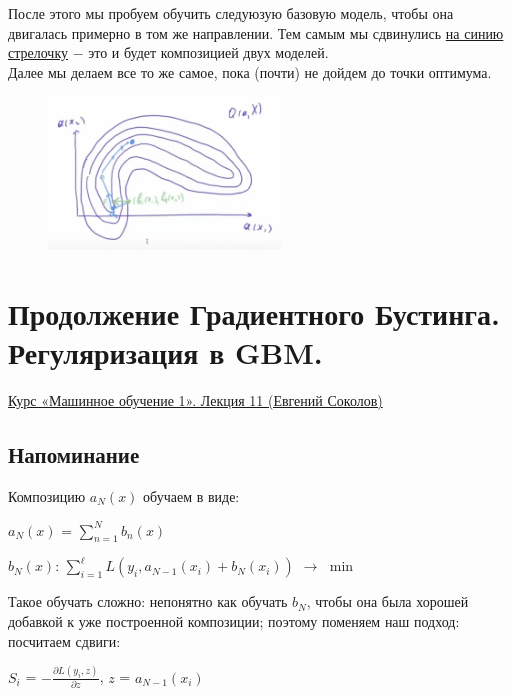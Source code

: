         После этого мы пробуем обучить следуюзую базовую модель, чтобы она двигалась примерно в том же направлении. Тем самым мы сдвинулись \underline{на синию стрелочку} $-$ это и будет композицией двух моделей.\\

        Далее мы делаем все то же самое, пока (почти) не дойдем до точки оптимума.

        \begin{figure}[H]
            \centering
            \includegraphics[width=0.55\textwidth]{images/10lecture/levelsGBM2.png}
        \end{figure}
     
        
        
        


\newpage
\section{Продолжение Градиентного Бустинга. Регуляризация в GBM. }
    \href{https://www.youtube.com/watch?v=C0gSbSjS1Xw&list=PLEqoHzpnmTfChItexxg2ZfxCsm-8QPsdS&index=13}{Курс «Машинное обучение 1». Лекция 11 (Евгений Соколов)}

    \subsection{Напоминание}

        Композицию $a_N(x)$ обучаем в виде:
        \begin{center}
            $a_N(x)$ = $\sum\limits_{n = 1}^{N}b_n(x)$
        \end{center}

        
        \begin{center}
            $b_N(x)$: \quad $\sum\limits_{i = 1}^{\ell}L(y_i, a_{N - 1}(x_i) + b_N(x_i))$ $\longrightarrow$ $\min$
        \end{center}

        Такое обучать сложно: непонятно как обучать $b_N$, чтобы она была хорошей добавкой к уже построенной композиции; поэтому поменяем наш подход: посчитаем сдвиги:
        \begin{center}
        \large
            $S_i$ = $- \frac{\partial L(y_i, z)}{\partial z}$, \quad\quad $z$ = $a_{N - 1}(x_i)$
        \end{center}


